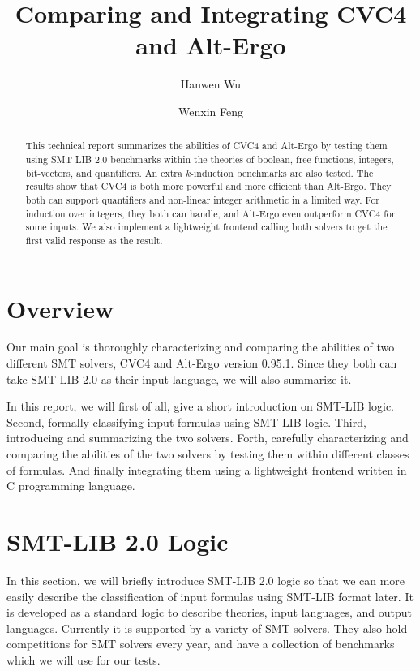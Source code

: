 \documentclass[10pt,twocolumn,letter]{article}
\title{\bf Comparing and Integrating CVC4 and Alt-Ergo}
\author{Hanwen Wu}
\author{Wenxin Feng}
\affil{Department of Computer Science\\Boston University\\
\small\texttt{hwwu,wenxinf@bu.edu}}
\theoremstyle{definition}
\begin{document}
\maketitle

\begin{abstract}
This technical report summarizes the abilities of CVC4 and Alt-Ergo by testing them using SMT-LIB 2.0 benchmarks within the theories of boolean, free functions, integers, bit-vectors, and quantifiers. An extra $k$-induction benchmarks are also tested. The results show that CVC4 is both more powerful and more efficient than Alt-Ergo. They both can support quantifiers and non-linear integer arithmetic in a limited way. For induction over integers, they both can handle, and Alt-Ergo even outperform CVC4 for some inputs. We also implement a lightweight frontend calling both solvers to get the first valid response as the result.
\end{abstract}
\section{Overview}




Our main goal is thoroughly characterizing and comparing the abilities of two different SMT solvers, CVC4\cite{barrett:cvc4:2011} and Alt-Ergo\cite{alt-ergo} version 0.95.1. Since they both can take SMT-LIB 2.0\cite{bs2010} as their input language, we will also summarize it.

In this report, we will first of all, give a short introduction on SMT-LIB logic. Second, formally classifying input formulas using SMT-LIB logic. Third, introducing and summarizing the two solvers. Forth, carefully characterizing and comparing the abilities of the two solvers by testing them within different classes of formulas. And finally integrating them using a lightweight frontend written in C programming language.

\section{SMT-LIB 2.0 Logic}

In this section, we will briefly introduce SMT-LIB 2.0 logic so that we can more easily describe the classification of input formulas using SMT-LIB format later. It is developed as a standard logic to describe theories, input languages, and output languages. Currently it is supported by a variety of SMT solvers. They also hold competitions for SMT solvers every year, and have a collection of benchmarks which we will use for our tests.
\end{document}
